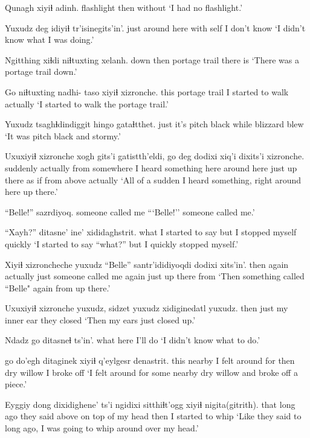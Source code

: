\documentclass[12pt]{article}
\begin{document}
\gll Qunagh xiyiɬ adinh. 
flashlight then without
\glt `I had no flashlight.'
\glend

\gll Yuxudz deg           {idiyiɬ} {tr'isinegits'in'.}
just   {around here} {with self}   {I don't know}
\glt `I didn't know what I was doing.'
\glend

\gll Ngitthing xiɬdi niɬtuxting xelanh.
down      then  {portage trail} {there is}
\glt `There was a portage trail down.'
\glend

\gll Go niɬtuxting nadhi- taso xiyiɬ xizronche.
this {portage trail} {} {I started to walk} actually
\glt `I started to walk the portage trail.'
\glend

\gll Yuxudz tsaghɬdindiggit hingo gataɬtthet. 
just   {it's pitch black}  while {blizzard blew}
\glt `It was pitch black and stormy.'
\glend

\gll Uxuxiyiɬ xizronche {xogh gits'i}         gatistth'eldi,  go deg dodixi xiq'i dixits'i xizronche.
suddenly actually          {from somewhere} {I heard something} here {around here} {just up there} {as if} {from above} actually
\glt `All of a sudden I heard something, right around here up there.'
\glend

\gll ``Belle!'' sazrdiyoq.
{}    {someone called me}
\glt ```Belle!'' someone called me.'
\glend

\gll ``Xayh?'' ditasne' ine' xididaghstrit.
what  {I started to say} but {I stopped myself quickly}
\glt `I started to say ``what?'' but I quickly stopped myself.'
\glend

\gll Xiyiɬ xizroncheche yuxudz ``Belle'' santr'ididiyoqdi dodixi xits'in'.
then   {again actually}         just  {}     {someone called me again} {just up there} from
\glt `Then something called ``Belle" again from up there.'
\glend

\gll Uxuxiyiɬ xizronche yuxudz, sidzet yuxudz xidiginedatl yuxudz.
then    {}        just   {my inner ear} {}  {they closed}
\glt `Then my ears just closed up.'
\glend

\gll Ndadz go    ditasneɬ ts'in'.
what  here  {I'll do}
\glt `I didn't know what to do.'
\glend

 go do'egh ditaginek xiyiɬ q'eylgesr denastrit.
{} this nearby {I felt around for} then {dry willow} {I broke off}
\glt `I felt around for some nearby dry willow and broke off a piece.'
\glend
 
\gll Eyggiy dong dixidighene' ts'i ngidixi sitthiɬt'ogg xiyiɬ nigita(gitrith). 
that  {long ago} {they said} {} above  {on top of my head}       then   {I started to whip}        
\glt `Like they said to long ago, I was going to whip around over my head.'
\glend
\end{document}
